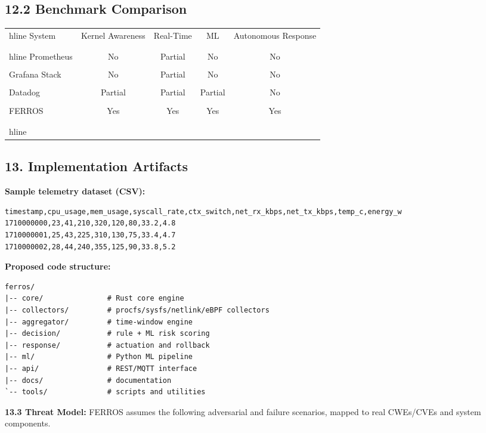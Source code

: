 \documentclass[11pt]{article}
\begin{document}
\subsection{12.2 Benchmark Comparison}
\begin{center}
\begin{tabular}{|l|c|c|c|c|}
\\hline
System & Kernel Awareness & Real-Time & ML & Autonomous Response \\\\
\\hline
Prometheus & No & Partial & No & No \\\\
Grafana Stack & No & Partial & No & No \\\\
Datadog & Partial & Partial & Partial & No \\\\
FERROS & Yes & Yes & Yes & Yes \\\\
\\hline
\end{tabular}
\end{center}

\subsection{13. Implementation Artifacts}
\textbf{Sample telemetry dataset (CSV):}
\begin{lstlisting}
timestamp,cpu_usage,mem_usage,syscall_rate,ctx_switch,net_rx_kbps,net_tx_kbps,temp_c,energy_w
1710000000,23,41,210,320,120,80,33.2,4.8
1710000001,25,43,225,310,130,75,33.4,4.7
1710000002,28,44,240,355,125,90,33.8,5.2
\end{lstlisting}

\textbf{Proposed code structure:}
\begin{lstlisting}
ferros/
|-- core/               # Rust core engine
|-- collectors/         # procfs/sysfs/netlink/eBPF collectors
|-- aggregator/         # time-window engine
|-- decision/           # rule + ML risk scoring
|-- response/           # actuation and rollback
|-- ml/                 # Python ML pipeline
|-- api/                # REST/MQTT interface
|-- docs/               # documentation
`-- tools/              # scripts and utilities
\end{lstlisting}

\textbf{13.3 Threat Model:}
FERROS assumes the following adversarial and failure scenarios, mapped to real CWEs/CVEs and system components.
\end{document}
